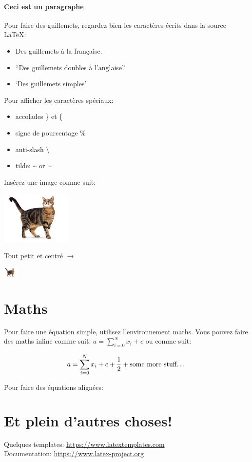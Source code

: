 \documentclass[paper=a4, fontsize=11pt]{article}
\begin{document}
\paragraph{Ceci est un paragraphe}
Pour faire des guillemets, regardez bien les caractères écrits dans la source \LaTeX: 
\begin{itemize}
\item \og Des guillemets à la française\fg{}.
\item ``Des guillemets doubles à l'anglaise''
\item `Des guillemets simples'
\end{itemize}

\vspace{0.5cm} 

Pour afficher les caractères spéciaux:
\begin{itemize}
\item accolades \} et \{
\item signe de pourcentage \%
\item anti-slash \textbackslash
\item tilde: \textasciitilde{} or $\sim$ 
\end{itemize}

\vspace{0.5cm} %


Insérez une image comme suit:

\includegraphics[width=100pt]{myimage.jpg} %

Tout petit et centré $\rightarrow$

\begin{center}
\includegraphics[width=20pt]{myimage.jpg} %
\end{center}

\section{Maths}

Pour faire une équation simple, utilisez l'environnement maths. Vous pouvez faire des maths inline
comme suit: $a = \sum_{i=0}^{N} x_i + c$ ou comme suit:

\[ a = \sum_{i=0}^{N} x_i + c + \dfrac{1}{2} + \text{some more stuff\dots}\]


Pour faire des équations alignées:


\section{Et plein d'autres choses!}

Quelques templates: \url{https://www.latextemplates.com} \\
Documentation: \url{https://www.latex-project.org}
\end{document}
